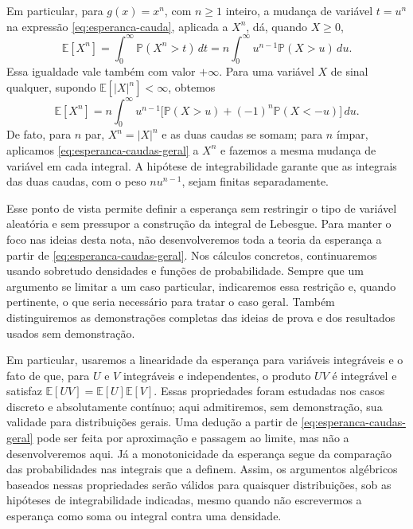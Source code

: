 \documentclass[12pt,portuguese]{article}
\theoremstyle{definition}
\theoremstyle{plainexercise}
\theoremstyle{starredexercise}
\theoremstyle{definition}
\begin{document}
Em particular, para $g(x)=x^n$, com $n\geqslant1$ inteiro, a mudança de
variável $t=u^n$ na expressão \eqref{eq:esperanca-cauda}, aplicada a $X^n$,
dá, quando $X\geqslant0$,
\begin{equation}\label{eq:potencia-nao-negativa-cauda}
\mathbb{E}[X^n]
=\int_0^\infty\mathbb{P}(X^n>t)\,dt
=n\int_0^\infty u^{n-1}\mathbb{P}(X>u)\,du.
\end{equation}
Essa igualdade vale também com valor $+\infty$. Para uma variável $X$ de
sinal qualquer, supondo $\mathbb{E}[|X|^n]<\infty$, obtemos
\begin{equation}\label{eq:potencia-caudas-geral}
\mathbb{E}[X^n]
=n\int_0^\infty u^{n-1}
\bigl[\mathbb{P}(X>u)+(-1)^n\mathbb{P}(X<-u)\bigr]\,du.
\end{equation}
De fato, para $n$ par, $X^n=|X|^n$ e as duas caudas se somam; para $n$
ímpar, aplicamos \eqref{eq:esperanca-caudas-geral} a $X^n$ e fazemos a
mesma mudança de variável em cada integral. A hipótese de integrabilidade
garante que as integrais das duas caudas, com o peso $n u^{n-1}$, sejam
finitas separadamente.

Esse ponto de vista permite definir a esperança sem restringir o tipo de
variável aleatória e sem pressupor a construção da integral de Lebesgue.
Para manter o foco nas ideias desta nota, não desenvolveremos toda a teoria
da esperança a partir de \eqref{eq:esperanca-caudas-geral}. Nos cálculos
concretos, continuaremos usando sobretudo densidades e funções de
probabilidade. Sempre que um argumento se limitar a um caso particular,
indicaremos essa restrição e, quando pertinente, o que seria necessário
para tratar o caso geral. Também distinguiremos as demonstrações completas
das ideias de prova e dos resultados usados sem demonstração.

Em particular, usaremos a linearidade da esperança para variáveis
integráveis e o fato de que, para $U$ e $V$ integráveis e independentes,
o produto $UV$ é integrável e satisfaz
$\mathbb{E}[UV]=\mathbb{E}[U]\mathbb{E}[V]$.
Essas propriedades foram estudadas nos casos discreto e
absolutamente contínuo; aqui admitiremos, sem demonstração, sua validade
para distribuições gerais. Uma dedução a partir de
\eqref{eq:esperanca-caudas-geral} pode ser feita por aproximação e passagem
ao limite, mas não a desenvolveremos aqui. Já a monotonicidade da esperança
segue da comparação das probabilidades nas integrais que a definem.
Assim, os argumentos algébricos baseados nessas propriedades serão válidos
para quaisquer distribuições, sob as hipóteses de integrabilidade
indicadas, mesmo quando não escrevermos a esperança como soma ou integral
contra uma densidade.
\end{document}
